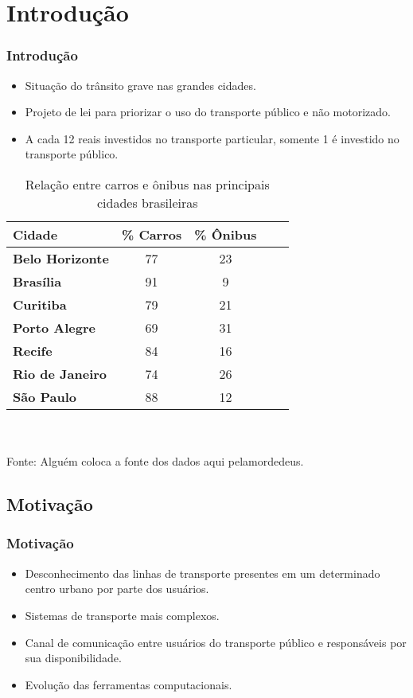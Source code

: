 \section{Introdução}

\frame
{
\frametitle{Introdução}
\begin{itemize}
\item Situação do trânsito grave nas grandes cidades.
\item Projeto de lei para priorizar o uso do transporte público e não motorizado.
\item A cada 12 reais investidos no transporte particular, somente 1 é investido no transporte público.
\end{itemize}

\begin{table}[!htb]
	\scriptsize
	\centering
	\caption{Relação entre carros e ônibus nas principais cidades brasileiras}
	\label{tab:carro_onibus}
	\begin{tabular}{lcccc}
		\hline
		\textbf{Cidade} & \textbf{\% Carros} & \textbf{\% Ônibus} \\
		\hline
		\textbf{Belo Horizonte} & 77 & 23 \\
		\textbf{Brasília} & 91 & 9 \\
		\textbf{Curitiba} & 79 & 21 \\
		\textbf{Porto Alegre} & 69 & 31 \\
		\textbf{Recife} & 84 & 16 \\
		\textbf{Rio de Janeiro} & 74 & 26 \\
		\textbf{São Paulo} & 88 & 12 \\
		\hline
	\end{tabular}
	\\ ~ \\
	\tiny
	Fonte: Alguém coloca a fonte dos dados aqui pelamordedeus.
\end{table}
}

\subsection{Motivação}
\frame
{
\frametitle{Motivação}
\begin{itemize}
\item Desconhecimento das linhas de transporte presentes em um determinado centro urbano por parte dos usuários.
\item Sistemas de transporte mais complexos.
\item Canal de comunicação entre usuários do transporte público e responsáveis por sua disponibilidade.
\item Evolução das ferramentas computacionais.
\end{itemize}
}

